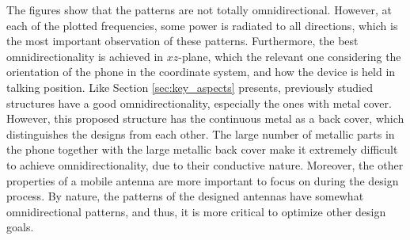 The figures show that the patterns are not totally omnidirectional. However, at each of the plotted frequencies, some power is radiated to all directions, which is the most important observation of these patterns. Furthermore, the best omnidirectionality is achieved in $xz$-plane, which the relevant one considering the orientation of the phone in the coordinate system, and how the device is held in talking position. Like Section \ref{sec:key_aspects} presents, previously studied structures have a good omnidirectionality, especially the ones with metal cover. However, this proposed structure has the continuous metal as a back cover, which distinguishes the designs from each other. The large number of metallic parts in the phone together with the large metallic back cover make it extremely difficult to achieve omnidirectionality, due to their conductive nature. Moreover, the other properties of a mobile antenna are more important to focus on during the design process. By nature, the patterns of the designed antennas have somewhat omnidirectional patterns, and thus, it is more critical to optimize other design goals.
\clearpage